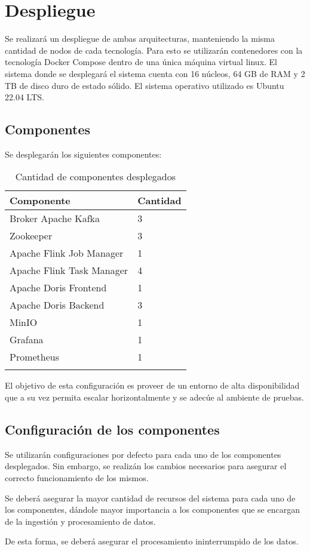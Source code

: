 \section{Despliegue}

Se realizará un despliegue de ambas arquitecturas, manteniendo la misma cantidad de nodos de cada tecnología.
Para esto se utilizarán contenedores con la tecnología Docker Compose dentro de una única máquina virtual linux.
El sistema donde se desplegará el sistema cuenta con 16 núcleos, 64 GB de RAM y 2 TB de disco duro de estado sólido.
El sistema operativo utilizado es Ubuntu 22.04 LTS.

\subsection{Componentes}

Se desplegarán los siguientes componentes: 

\begin{longtable}{|p{6cm}|p{6cm}|}
    \hline
    \textbf{Componente} & \textbf{Cantidad} \\
    \hline
    \endhead
    Broker Apache Kafka & 3 \\ 
    \hline
    Zookeeper & 3 \\ 
    \hline
    Apache Flink Job Manager & 1 \\ 
    \hline
    Apache Flink Task Manager & 4 \\ 
    \hline
    Apache Doris Frontend & 1 \\ 
    \hline
    Apache Doris Backend & 3 \\ 
    \hline
    MinIO & 1 \\ 
    \hline
    Grafana & 1 \\ 
    \hline
    Prometheus & 1 \\ 
    \hline 
    \caption{Cantidad de componentes desplegados}
    \label{tab:deployed_components}
\end{longtable}

El objetivo de esta configuración es proveer de un entorno de alta disponibilidad que a su vez permita escalar horizontalmente y
se adecúe al ambiente de pruebas.

\newpage

\subsection{Configuración de los componentes}

Se utilizarán configuraciones por defecto para cada uno de los componentes desplegados.
Sin embargo, se realizán los cambios necesarios para asegurar el correcto funcionamiento de los mismos.\newline

Se deberá asegurar la mayor cantidad de recursos del sistema para cada uno de los componentes,
dándole mayor importancia a los componentes que se encargan de la ingestión y procesamiento de datos.\newline

De esta forma, se deberá asegurar el procesamiento ininterrumpido de los datos.